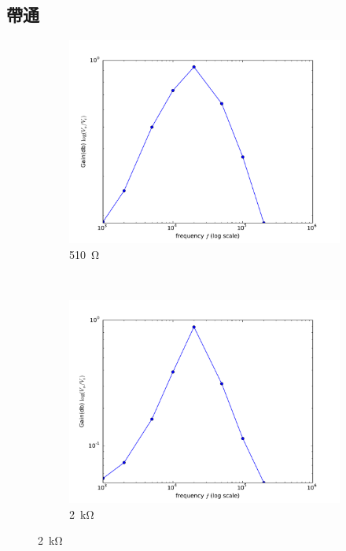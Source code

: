 \documentclass[12pt, a4paper]{article}
\begin{document}
\subsection{帶通}
\begin{figure}[H]
  \centering
  \begin{subfigure}[b]{0.45\textwidth}
    \includegraphics[width=1\textwidth]{data/img/q5.pdf}
    \caption{\SI{510}\ohm}
  \end{subfigure}
  ~
  \begin{subfigure}[b]{0.45\textwidth}
    \includegraphics[width=1\textwidth]{data/img/q6.pdf}
    \caption{\SI{2}\kohm}
  \end{subfigure}
\end{figure}
\end{document}
